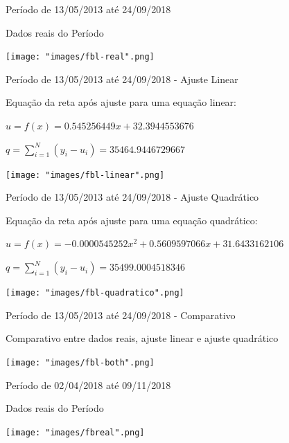\documentclass[10pt]{beamer}
\begin{document}
\begin{frame}{Período de 13/05/2013 até 24/09/2018}

  Dados reais do Período
  
  \texttt{[image: "images/fbl-real".png]}
\end{frame}

\begin{frame}{Período de 13/05/2013 até 24/09/2018 - Ajuste Linear}

  Equação da reta após ajuste para uma equação linear:
  \begin{center}
  $u = f(x) = 0.545256449x + 32.3944553676$
  
  $q = \sum_{i=1}^{N} (y_{i}-u_{i}) = 35464.9446729667$
  \end{center}
  
  \begin{center}
    \texttt{[image: "images/fbl-linear".png]}
  \end{center}
\end{frame}

\begin{frame}{Período de 13/05/2013 até 24/09/2018 - Ajuste Quadrático}

  Equação da reta após ajuste para uma equação quadrático:
  \begin{center}
  $u = f(x) = -0.0000545252x^2 + 0.5609597066x + 31.6433162106$
  
  $q = \sum_{i=1}^{N} (y_{i}-u_{i}) = 35499.0004518346$
  \end{center}
  
  \begin{center}
    \texttt{[image: "images/fbl-quadratico".png]}
  \end{center}
\end{frame}

\begin{frame}{Período de 13/05/2013 até 24/09/2018 - Comparativo}

  Comparativo entre dados reais, ajuste linear e ajuste quadrático
  
  \begin{center}
    \texttt{[image: "images/fbl-both".png]}
  \end{center}
\end{frame}

\begin{frame}{Período de 02/04/2018 até 09/11/2018}

  Dados reais do Período
  
  \begin{center}
    \texttt{[image: "images/fbreal".png]}
  \end{center}
\end{frame}
\end{document}
